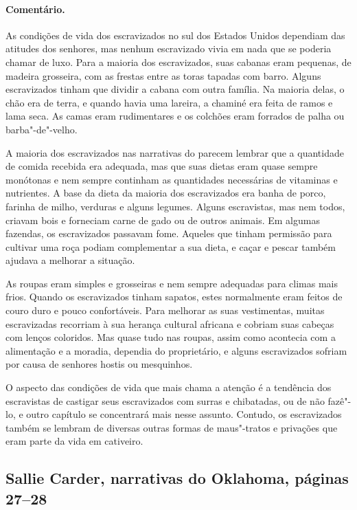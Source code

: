 \paragraph{Comentário.}\quad
{\small
As condições de vida dos escravizados no sul dos Estados Unidos
dependiam das atitudes dos senhores, mas nenhum escravizado vivia em nada
que se poderia chamar de luxo. Para a maioria dos escravizados, suas cabanas
eram pequenas, de madeira grosseira, com as frestas entre as toras
tapadas com barro. Alguns escravizados tinham que dividir a cabana com outra
família. Na maioria delas, o chão era de terra, e quando havia uma
lareira, a chaminé era feita de ramos e lama seca. As camas eram
rudimentares e os colchões eram forrados de palha ou barba"-de"-velho.

A maioria dos escravizados nas narrativas do  parecem lembrar que a
quantidade de comida recebida era adequada, mas que suas dietas eram
quase sempre monótonas e nem sempre continham as quantidades necessárias
de vitaminas e nutrientes. A base da dieta da maioria dos escravizados era
banha de porco, farinha de milho, verduras e alguns legumes. Alguns
escravistas, mas nem todos, criavam bois e forneciam carne de gado ou de
outros animais. Em algumas fazendas, os escravizados passavam fome. Aqueles
que tinham permissão para cultivar uma roça podiam complementar a sua
dieta, e caçar e pescar também ajudava a melhorar a situação.

As roupas eram simples e grosseiras e nem sempre adequadas para
climas mais frios. Quando os escravizados tinham sapatos, estes normalmente
eram feitos de couro duro e pouco confortáveis. Para melhorar as suas
vestimentas, muitas escravizadas recorriam à sua herança cultural africana e
cobriam suas cabeças com lenços coloridos. Mas quase tudo nas roupas,
assim como acontecia com a alimentação e a moradia, dependia do
proprietário, e alguns escravizados sofriam por causa de senhores hostis ou
mesquinhos.

O aspecto das condições de vida que mais chama a atenção é a
tendência dos escravistas de castigar seus escravizados com surras e
chibatadas, ou de não fazê"-lo, e outro capítulo se concentrará mais
nesse assunto. Contudo, os escravizados também se lembram de diversas outras
formas de maus"-tratos e privações que eram parte da vida em cativeiro.
}

\subsection{Sallie Carder, narrativas do Oklahoma, páginas 27--28} \label{ref48}

